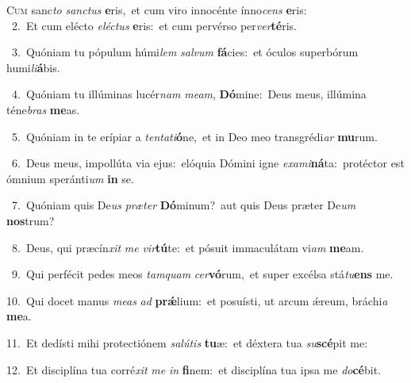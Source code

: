 \lettrine{\initial\textcolor{\initialcolor}{C}}{um} sanc\textit{to} \textit{sanc}\-\textit{tus} \textbf{e}\-ris,~\star et cum viro innocénte ínno\textit{cens} \textbf{e}\-ris:\\
{\numbfont\textcolor{\numbcolor}{~2.}}~Et cum elécto \textit{e}\-\textit{léc}\textit{tus} \textbf{e}\-ris:~\star et cum pervérso per\-\textit{ver}\-\textbf{té}ris.\par
{\numbfont\textcolor{\numbcolor}{~3.}}~Quóniam tu pópulum húmi\textit{lem} \textit{sal}\-\textit{vum} \textbf{fá}\-cies:~\star et óculos superbórum humi\-\textit{li}\-\textbf{á}bis.\par
{\numbfont\textcolor{\numbcolor}{~4.}}~Quóniam tu illúminas lucér\textit{nam} \textit{me}\-\textit{am}, \textbf{Dó}\-mine:~\star Deus meus, illúmina téne\textit{bras} \textbf{me}\-as.\par
{\numbfont\textcolor{\numbcolor}{~5.}}~Quóniam in te erípiar a \textit{ten}\-\textit{ta}\textit{ti}\textbf{ó}ne,~\star et in Deo meo transgrédi\textit{ar} \textbf{mu}\-rum.\par
{\numbfont\textcolor{\numbcolor}{~6.}}~Deus meus, impollúta via ejus:~\dagger elóquia Dómini igne \textit{ex}\-\textit{a}\textit{mi}\textbf{ná}ta:~\star protéctor est ómnium speránti\textit{um} \textbf{in} se.\par
{\numbfont\textcolor{\numbcolor}{~7.}}~Quóniam quis De\textit{us} \textit{præ}\-\textit{ter} \textbf{Dó}\-minum?~\star aut quis Deus præter De\textit{um} \textbf{nos}\-trum?\par
{\numbfont\textcolor{\numbcolor}{~8.}}~Deus, qui præcín\textit{xit} \textit{me} \textit{vir}\-\textbf{tú}te:~\star et pósuit immaculátam vi\textit{am} \textbf{me}\-am.\par
{\numbfont\textcolor{\numbcolor}{~9.}}~Qui perfécit pedes meos \textit{tam}\-\textit{quam} \textit{cer}\-\textbf{vó}rum,~\star et super excélsa stá\-\textit{tu}\-\textbf{ens} me.\par
{\numbfont\textcolor{\numbcolor}{10.}}~Qui docet manus \textit{me}\-\textit{as} \textit{ad} \textbf{prǽ}\-lium:~\star et posuísti, ut arcum ǽreum, bráchi\textit{a} \textbf{me}\-a.\par
{\numbfont\textcolor{\numbcolor}{11.}}~Et dedísti mihi protectiónem \textit{sa}\-\textit{lú}\textit{tis} \textbf{tu}\-æ:~\star et déxtera tua \textit{su}\-\textbf{scé}pit me:\par
{\numbfont\textcolor{\numbcolor}{12.}}~Et disciplína tua corré\textit{xit} \textit{me} \textit{in} \textbf{fi}\-nem:~\star et disciplína tua ipsa me \textit{do}\-\textbf{cé}bit.\par
